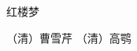 \documentclass[10pt,openany]{book}
\begin{document}
\frontmatter

\begin{titlepage}
\centering
{\Huge 红楼梦\par}
\vspace{1.5cm}
{\LARGE （清）曹雪芹 （清）高鹗 \par}
\vfill
\newpage %
\end{titlepage}

\pagestyle{tocstyle}
\tableofcontents %

\mainmatter
\pagestyle{mystyle}


\end{document}
